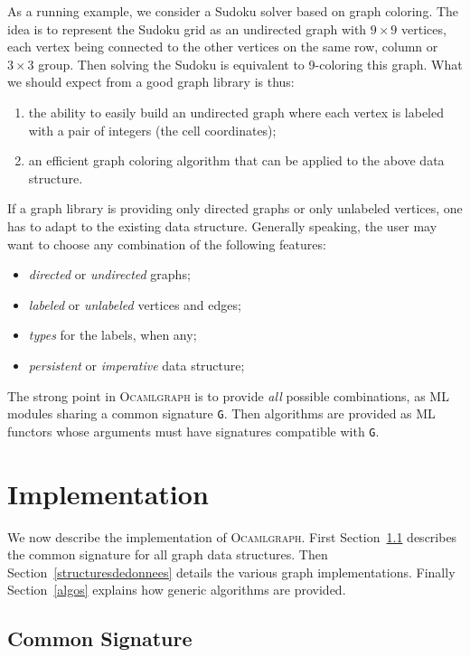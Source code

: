 \documentclass[]{tfp05symp}
\newcommand{\ocamlgraph}{\textsc{Ocamlgraph}\xspace}
\begin{document}
As a running example, we consider a Sudoku solver based on graph
coloring.  The idea is to represent the Sudoku grid as an undirected
graph with $9\times 9$ vertices, each vertex being connected to the
other vertices on the same row, column or $3\times 3$ group. Then
solving the Sudoku is equivalent to 9-coloring this graph.
What we should expect from a good graph library is thus:
\begin{enumerate}
\item the ability to easily build an undirected graph where each
  vertex is labeled with a pair of integers (the cell coordinates);
\item an efficient graph coloring algorithm that can be applied to the
  above data structure. 
\end{enumerate}
If a graph library is providing only directed graphs or only
unlabeled vertices, one has to adapt to the existing data structure.
Generally speaking, the user may want
to choose any combination of the following features:
\begin{itemize}
\item \emph{directed} or \emph{undirected} graphs;
\item \emph{labeled} or \emph{unlabeled} vertices and edges;
\item \emph{types} for the labels, when any;
\item \emph{persistent} or \emph{imperative} data structure;
\end{itemize}
The strong point in \ocamlgraph is to provide \emph{all} possible
combinations, as ML modules sharing a common signature \texttt{G}.
Then algorithms are provided as ML functors whose arguments must have
signatures compatible with \texttt{G}.

\section{Implementation}

We now describe the implementation of
\ocamlgraph. First Section~\ref{interface} describes the common
signature for all graph data structures.
Then Section~\ref{structuresdedonnees} details the various graph
implementations. Finally Section~\ref{algos} explains how
generic algorithms are provided.

\subsection{Common Signature}\label{interface}
\end{document}
